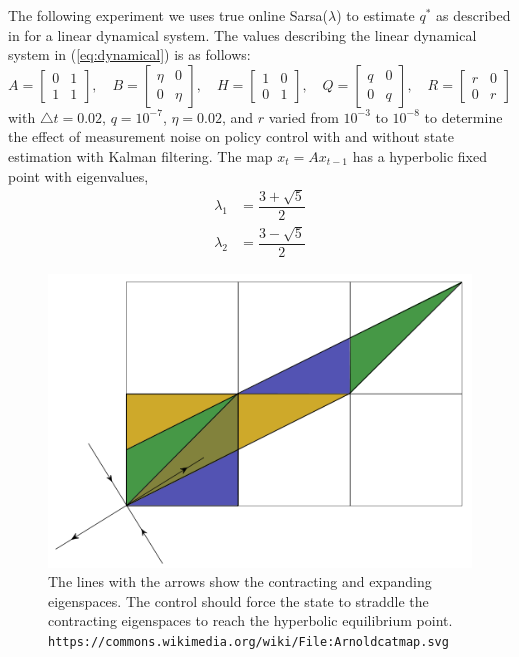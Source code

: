 \documentclass{article}
\begin{document}
The following experiment we uses true online Sarsa($\lambda$) to estimate $q^*$ as described in \cite{sutton2018reinforcement} for a linear dynamical system. The values describing the linear dynamical system in (\ref{eq:dynamical}) is as follows:
\[
A = \begin{bmatrix}
0 & 1 \\
1 & 1
\end{bmatrix}, \quad 
B = \begin{bmatrix}
\eta & 0 \\
0 & \eta
\end{bmatrix}, \quad
H = \begin{bmatrix}
1 & 0 \\
0 & 1
\end{bmatrix}, \quad
Q = \begin{bmatrix}
q & 0 \\
0 & q
\end{bmatrix}, \quad
R = \begin{bmatrix}
r & 0 \\
0 & r
\end{bmatrix}
\]
with $\triangle t = 0.02$, $q = 10^{-7}$, $\eta = 0.02$,  and $r$ varied from $10^{-3}$ to $10^{-8}$ to determine the effect of measurement noise on policy control with and without state estimation with Kalman filtering. The map $x_t = Ax_{t-1}$ has a hyperbolic fixed point with eigenvalues,
\begin{align*}
	\lambda_1 &= \dfrac{3 + \sqrt{5}}{2} \\
	\lambda_2 &= \dfrac{3 - \sqrt{5}}{2}
\end{align*}
\begin{figure}[H]
	\includegraphics[scale=0.5]{Arnoldcatmap.png}
	\caption{The lines with the arrows show the contracting and expanding eigenspaces. The control should force the state to straddle the contracting eigenspaces to reach the hyperbolic equilibrium point.  \texttt{https://commons.wikimedia.org/wiki/File:Arnoldcatmap.svg} }
\end{figure}
\end{document}

